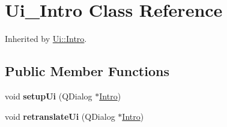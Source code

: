 \hypertarget{class_ui___intro}{}\section{Ui\+\_\+\+Intro Class Reference}
\label{class_ui___intro}


Inherited by \mbox{\hyperlink{class_ui_1_1_intro}{Ui\+::\+Intro}}.

\subsection*{Public Member Functions}
\begin{DoxyCompactItemize}
\item 
\mbox{\label{class_ui___intro_a7b2c7bf108bc1e4bd6c76452b18ab44a}} 
void {\bfseries setup\+Ui} (Q\+Dialog $\ast$\mbox{\hyperlink{class_intro}{Intro}})
\item 
\mbox{\label{class_ui___intro_a77da81c1f07df5fe0b866573289dcec8}} 
void {\bfseries retranslate\+Ui} (Q\+Dialog $\ast$\mbox{\hyperlink{class_intro}{Intro}})
\end{DoxyCompactItemize}
